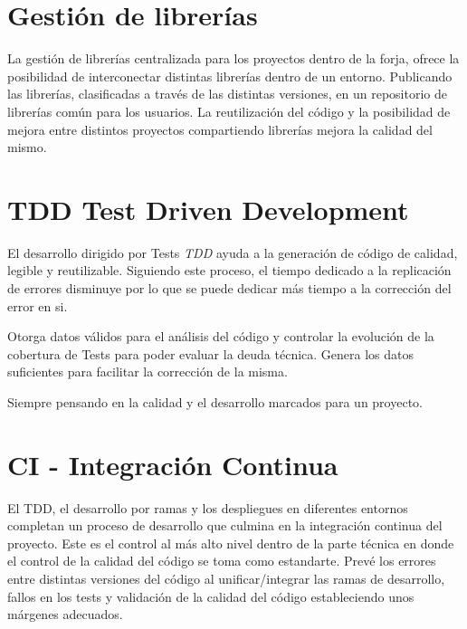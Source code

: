 
\section{Gestión de librerías}
\label{sec:gestion-librerias}

\par La gesti\'on de librer\'ias centralizada para los proyectos dentro de la forja, ofrece la posibilidad de interconectar distintas librerías dentro de un entorno. Publicando las librerías, clasificadas a través de las distintas versiones, en un repositorio de librerías común para los usuarios. La reutilización del código y la posibilidad de mejora entre distintos proyectos compartiendo librerías mejora la calidad del mismo.


\section{TDD Test Driven Development}
\label{sec:tdd}

\par El desarrollo dirigido por Tests \emph{TDD} ayuda a la generación de código de calidad, legible y reutilizable. Siguiendo este proceso, el tiempo dedicado a la replicación de errores disminuye por lo que se puede dedicar más tiempo a la corrección del error en si.

\par Otorga datos válidos para el análisis del código y controlar la evolución de la cobertura de Tests para poder evaluar la deuda técnica. Genera los datos suficientes para facilitar la corrección de la misma.

\par Siempre pensando en la calidad y el desarrollo marcados para un proyecto.


\section{CI - Integración Continua}
\label{sec:integracion-continua}

\par El TDD, el desarrollo por ramas y los despliegues en diferentes entornos completan un proceso de desarrollo que culmina en la integración continua del proyecto. Este es el control al más alto nivel dentro de la parte técnica en donde el control de la calidad del código se toma como estandarte. Prevé los errores entre distintas versiones del código al unificar/integrar las ramas de desarrollo, fallos en los tests y validación de la calidad del código estableciendo unos márgenes adecuados.

